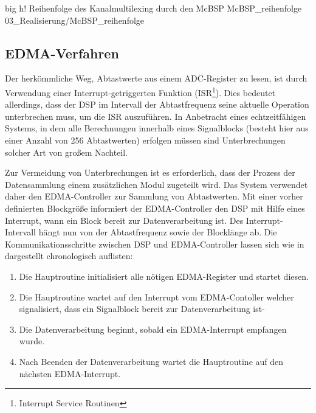          {big}                                                       %
         {h!}                                                  %
         {Reihenfolge des Kanalmultilexing durch den McBSP}    %
         {McBSP_reihenfolge}                                               %
         {03_Realisierung/McBSP_reihenfolge}


\subsection{EDMA-Verfahren}
\label{subsec:EDMAVerfahren}
Der herkömmliche Weg, Abtastwerte aus einem ADC-Register zu lesen, ist durch Verwendung einer Interrupt-getriggerten Funktion (ISR\footnote{Interrupt Service Routinen}). Dies bedeutet allerdings, dass der DSP im Intervall der Abtastfrequenz seine aktuelle Operation unterbrechen muss, um die ISR auszuführen. In Anbetracht eines echtzeitfähigen Systems, in dem alle Berechnungen innerhalb eines Signalblocks (besteht hier aus einer Anzahl von 256 Abtastwerten) erfolgen müssen sind Unterbrechungen solcher Art von großem Nachteil. 

Zur Vermeidung von Unterbrechungen ist es erforderlich, dass der Prozess der Datensammlung einem zusätzlichen Modul zugeteilt wird. Das System verwendet daher den EDMA-Controller zur Sammlung von Abtastwerten. Mit einer vorher definierten Blockgröße informiert der EDMA-Controller den DSP mit Hilfe eines Interrupt, wann ein Block bereit zur Datenverarbeitung ist. Des Interrupt-Intervall hängt nun von der Abtastfrequenz sowie der Blocklänge ab. Die Kommunikationsschritte zwischen DSP und EDMA-Controller lassen sich wie in  dargestellt chronologisch auflisten:

\begin{enumerate}
    \item Die Hauptroutine initialisiert alle nötigen EDMA-Register und startet diesen.
    \item Die Hauptroutine wartet auf den Interrupt vom EDMA-Contoller welcher signalisiert, dass ein Signalblock bereit zur Datenverarbeitung ist-
    \item Die Datenverarbeitung beginnt, sobald ein EDMA-Interrupt empfangen wurde.
    \item Nach Beenden der Datenverarbeitung wartet die Hauptroutine auf den nächsten EDMA-Interrupt.
\end{enumerate}


